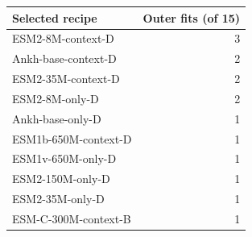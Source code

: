 
{\small\setlength{\tabcolsep}{4pt}
\begin{tabularx}{\textwidth}{Xr}
\toprule
Selected recipe & Outer fits (of 15) \\
\midrule
ESM2-\allowbreak{}8M-\allowbreak{}context-\allowbreak{}D & 3 \\
Ankh-\allowbreak{}base-\allowbreak{}context-\allowbreak{}D & 2 \\
ESM2-\allowbreak{}35M-\allowbreak{}context-\allowbreak{}D & 2 \\
ESM2-\allowbreak{}8M-\allowbreak{}only-\allowbreak{}D & 2 \\
Ankh-\allowbreak{}base-\allowbreak{}only-\allowbreak{}D & 1 \\
ESM1b-\allowbreak{}650M-\allowbreak{}context-\allowbreak{}D & 1 \\
ESM1v-\allowbreak{}650M-\allowbreak{}only-\allowbreak{}D & 1 \\
ESM2-\allowbreak{}150M-\allowbreak{}only-\allowbreak{}D & 1 \\
ESM2-\allowbreak{}35M-\allowbreak{}only-\allowbreak{}D & 1 \\
ESM-\allowbreak{}C-\allowbreak{}300M-\allowbreak{}context-\allowbreak{}B & 1 \\
\bottomrule
\end{tabularx}}

